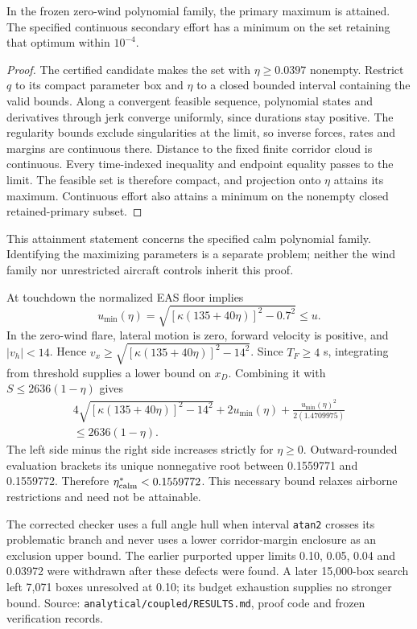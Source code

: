 \begin{proposition}
In the frozen zero-wind polynomial family, the primary maximum is attained. The specified continuous secondary effort has a minimum on the set retaining that optimum within $10^{-4}$.
\end{proposition}
\begin{proof}
The certified candidate makes the set with $\eta\geq0.0397$ nonempty. Restrict $q$ to its compact parameter box and $\eta$ to a closed bounded interval containing the valid bounds. Along a convergent feasible sequence, polynomial states and derivatives through jerk converge uniformly, since durations stay positive. The regularity bounds exclude singularities at the limit, so inverse forces, rates and margins are continuous there. Distance to the fixed finite corridor cloud is continuous. Every time-indexed inequality and endpoint equality passes to the limit. The feasible set is therefore compact, and projection onto $\eta$ attains its maximum. Continuous effort also attains a minimum on the nonempty closed retained-primary subset.
\end{proof}
This attainment statement concerns the specified calm polynomial family. Identifying the maximizing parameters is a separate problem; neither the wind family nor unrestricted aircraft controls inherit this proof.

At touchdown the normalized EAS floor implies
\[
u_{\min}(\eta)=\sqrt{[\kappa(135+40\eta)]^2-0.7^2}\leq u.
\]
In the zero-wind flare, lateral motion is zero, forward velocity is positive, and $|v_h|<14$. Hence $v_x\geq\sqrt{[\kappa(135+40\eta)]^2-14^2}$. Since $T_F\geq4$ s, integrating from threshold supplies a lower bound on $x_D$. Combining it with $S\leq2636(1-\eta)$ gives
\begin{multline}
4\sqrt{[\kappa(135+40\eta)]^2-14^2}+2u_{\min}(\eta)
+\frac{u_{\min}(\eta)^2}{2(1.4709975)}\\
\leq2636(1-\eta).
\end{multline}
The left side minus the right side increases strictly for $\eta\geq0$. Outward-rounded evaluation brackets its unique nonnegative root between 0.1559771 and 0.1559772. Therefore $\eta^*_{\rm calm}<0.1559772$. This necessary bound relaxes airborne restrictions and need not be attainable.

The corrected checker uses a full angle hull when interval \texttt{atan2} crosses its problematic branch and never uses a lower corridor-margin enclosure as an exclusion upper bound. The earlier purported upper limits 0.10, 0.05, 0.04 and 0.03972 were withdrawn after these defects were found. A later 15,000-box search left 7,071 boxes unresolved at 0.10; its budget exhaustion supplies no stronger bound. Source: \texttt{analytical/coupled/RESULTS.md}, proof code and frozen verification records.
\par\medskip
